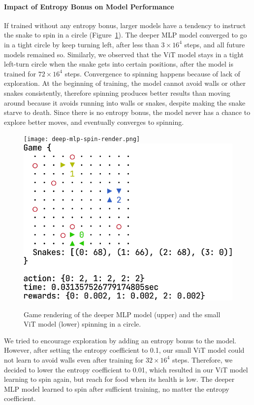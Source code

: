 \documentclass[conference]{IEEEtran}
\begin{document}
\paragraph{Impact of Entropy Bonus on Model Performance}
If trained without any entropy bonus,
larger models have a tendency to instruct the snake to spin in a circle
(Figure~\ref{fig:render}).
The deeper MLP model converged to go in a tight circle by keep turning left,
after less than $3\times 16^4$ steps, and all future models remained so.
Similarly,
we observed that the ViT model stays in a tight left-turn circle when the
snake gets into certain positions,
after the model is trained for $72\times 16^4$ steps.
Convergence to spinning happens because of lack of exploration.
At the beginning of training,
the model cannot avoid walls or other snakes consistently,
therefore spinning produces better results than moving around because it avoids
running into walls or snakes, despite making the snake starve to death.
Since there is no entropy bonus,
the model never has a chance to explore better moves,
and eventually converges to spinning.

\begin{figure}
    \centering
    \texttt{[image: deep-mlp-spin-render.png]}\\[24pt]
    \includegraphics[width=\linewidth]{vit_spin_render.png}
    \caption{Game rendering of the deeper MLP model (upper)
        and the small ViT model (lower) spinning in a circle.
    }
    \label{fig:render}
\end{figure}

We tried to encourage exploration by adding an entropy bonus to the model.
However, after setting the entropy coefficient to 0.1,
our small ViT model could not learn to avoid walls even after training for
$32\times 16^4$ steps. Therefore,
we decided to lower the entropy coefficient to 0.01,
which resulted in our ViT model learning to spin again,
but reach for food when its health is low.
The deeper MLP model learned to spin after sufficient training,
no matter the entropy coefficient.
\end{document}
